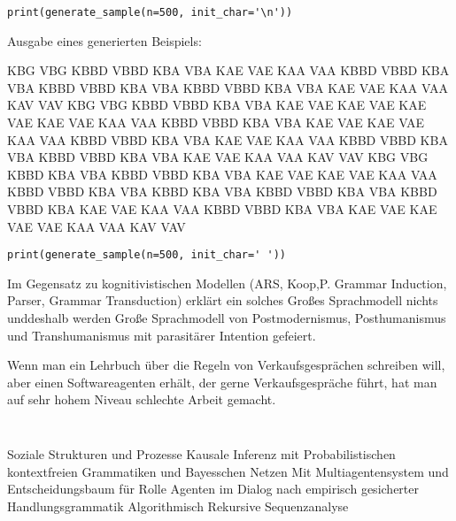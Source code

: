 \documentclass[12pt]{article}
\begin{document}
\begin{verbatim}
print(generate_sample(n=500, init_char='\n'))
\end{verbatim}

Ausgabe eines generierten Beispiels:


KBG VBG 
KBBD VBBD KBA VBA KAE VAE KAA VAA 
KBBD VBBD KBA VBA KBBD VBBD KBA VBA KBBD VBBD KBA VBA KAE VAE 
KAA VAA 
KAV VAV 
KBG VBG 
KBBD VBBD KBA VBA KAE VAE KAE VAE KAE VAE KAE VAE KAA VAA 
KBBD VBBD KBA VBA KAE VAE KAE VAE KAA VAA 
KBBD VBBD KBA VBA KAE VAE KAA VAA 
KBBD VBBD KBA VBA KBBD VBBD KBA VBA KAE VAE KAA VAA 
KAV VAV
KBG VBG
KBBD KBA VBA KBBD VBBD KBA VBA KAE VAE KAE VAE KAA VAA
KBBD VBBD KBA VBA KBBD KBA VBA KBBD VBBD KBA VBA KBBD VBBD KBA 
KAE VAE KAA VAA
KBBD VBBD KBA VBA KAE VAE KAE VAE VAE KAA VAA
KAV VAV

\begin{verbatim}
print(generate_sample(n=500, init_char=' '))
\end{verbatim}

Im Gegensatz zu kognitivistischen Modellen 
(ARS, Koop,P. Grammar Induction, Parser, Grammar Transduction)
erklärt ein solches Großes Sprachmodell nichts unddeshalb werden 
Große Sprachmodell von Postmodernismus, Posthumanismus und Transhumanismus 
mit parasitärer Intention gefeiert.

Wenn man ein Lehrbuch über die Regeln von Verkaufsgesprächen schreiben will, 
aber einen Softwareagenten erhält, der gerne Verkaufsgespräche führt,
hat man auf sehr hohem Niveau schlechte Arbeit gemacht.



\begin{verbatim}

\end{verbatim}

\begin{verbatim}

\end{verbatim}

Soziale Strukturen und Prozesse
Kausale Inferenz mit Probabilistischen kontextfreien Grammatiken und Bayesschen Netzen
Mit Multiagentensystem und Entscheidungsbaum für Rolle Agenten im Dialog nach empirisch gesicherter Handlungsgrammatik
Algorithmisch Rekursive Sequenzanalyse
\end{document}

